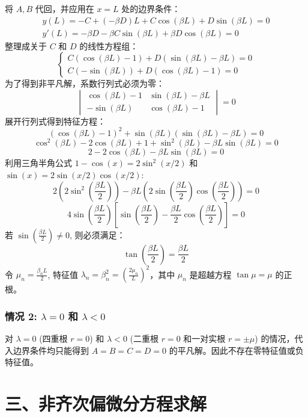 \documentclass{article}
\begin{document}
	将 $A, B$ 代回，并应用在 $x=L$ 处的边界条件：
	\begin{align*}
		y(L) = -C + (-\beta D)L + C \cos(\beta L) + D \sin(\beta L) = 0 \\
		y'(L) = -\beta D - \beta C \sin(\beta L) + \beta D \cos(\beta L) = 0
	\end{align*}
	整理成关于 $C$ 和 $D$ 的线性方程组：
	\[
	\begin{cases}
		C(\cos(\beta L) - 1) + D(\sin(\beta L) - \beta L) = 0 \\
		C(-\sin(\beta L)) + D(\cos(\beta L) - 1) = 0
	\end{cases}
	\]
	为了得到非平凡解，系数行列式必须为零：
	\[
	\begin{vmatrix}
		\cos(\beta L) - 1 & \sin(\beta L) - \beta L \\
		-\sin(\beta L) & \cos(\beta L) - 1
	\end{vmatrix}
	= 0
	\]
	展开行列式得到特征方程：
	\[
	(\cos(\beta L) - 1)^2 + \sin(\beta L)(\sin(\beta L) - \beta L) = 0
	\]
	\[
	\cos^2(\beta L) - 2\cos(\beta L) + 1 + \sin^2(\beta L) - \beta L \sin(\beta L) = 0
	\]
	\[
	2 - 2\cos(\beta L) - \beta L \sin(\beta L) = 0
	\]
	利用三角半角公式 $1-\cos(x) = 2\sin^2(x/2)$ 和 $\sin(x) = 2\sin(x/2)\cos(x/2)$:
	\[
	2 \left( 2\sin^2\left(\frac{\beta L}{2}\right) \right) - \beta L \left( 2\sin\left(\frac{\beta L}{2}\right)\cos\left(\frac{\beta L}{2}\right) \right) = 0
	\]
	\[
	4\sin\left(\frac{\beta L}{2}\right) \left[ \sin\left(\frac{\beta L}{2}\right) - \frac{\beta L}{2}\cos\left(\frac{\beta L}{2}\right) \right] = 0
	\]
	若 $\sin(\frac{\beta L}{2}) \neq 0$, 则必须满足：
	\[
	\tan\left(\frac{\beta L}{2}\right) = \frac{\beta L}{2}
	\]
	令 $\mu_n = \frac{\beta_n L}{2}$, 特征值 $\lambda_n = \beta_n^2 = (\frac{2\mu_n}{L})^2$，其中 $\mu_n$ 是超越方程 $\tan \mu = \mu$ 的正根。
	
	\subsubsection*{情况 2: $\lambda = 0$ 和 $\lambda < 0$}
	对 $\lambda = 0$ (四重根 $r=0$) 和 $\lambda < 0$ (二重根 $r=0$ 和一对实根 $r=\pm\mu$) 的情况，代入边界条件均只能得到 $A=B=C=D=0$ 的平凡解。因此不存在零特征值或负特征值。
	
	\section*{三、非齐次偏微分方程求解}
	
\end{document}
